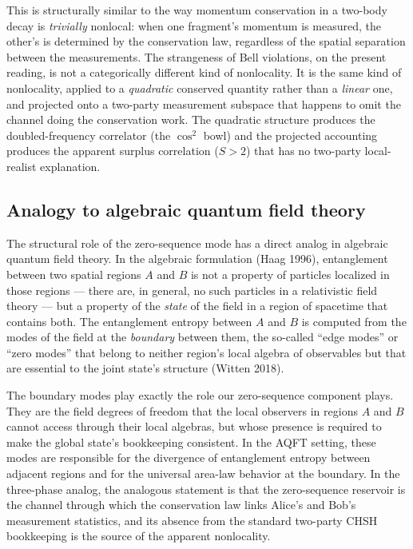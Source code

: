 \documentclass[
  11pt]{article}
\begin{document}
This is structurally similar to the way momentum conservation in a
two-body decay is \emph{trivially} nonlocal: when one fragment's
momentum is measured, the other's is determined by the conservation law,
regardless of the spatial separation between the measurements. The
strangeness of Bell violations, on the present reading, is not a
categorically different kind of nonlocality. It is the same kind of
nonlocality, applied to a \emph{quadratic} conserved quantity rather
than a \emph{linear} one, and projected onto a two-party measurement
subspace that happens to omit the channel doing the conservation work.
The quadratic structure produces the doubled-frequency correlator (the
\(\cos^2\) bowl) and the projected accounting produces the apparent
surplus correlation (\(S > 2\)) that has no two-party local-realist
explanation.

\subsection{Analogy to algebraic quantum field
theory}\label{analogy-to-algebraic-quantum-field-theory}

The structural role of the zero-sequence mode has a direct analog in
algebraic quantum field theory. In the algebraic formulation (Haag
1996), entanglement between two spatial regions \(A\) and \(B\) is not a
property of particles localized in those regions --- there are, in
general, no such particles in a relativistic field theory --- but a
property of the \emph{state} of the field in a region of spacetime that
contains both. The entanglement entropy between \(A\) and \(B\) is
computed from the modes of the field at the \emph{boundary} between
them, the so-called ``edge modes'' or ``zero modes'' that belong to
neither region's local algebra of observables but that are essential to
the joint state's structure (Witten 2018).

The boundary modes play exactly the role our zero-sequence component
plays. They are the field degrees of freedom that the local observers in
regions \(A\) and \(B\) cannot access through their local algebras, but
whose presence is required to make the global state's bookkeeping
consistent. In the AQFT setting, these modes are responsible for the
divergence of entanglement entropy between adjacent regions and for the
universal area-law behavior at the boundary. In the three-phase analog,
the analogous statement is that the zero-sequence reservoir is the
channel through which the conservation law links Alice's and Bob's
measurement statistics, and its absence from the standard two-party CHSH
bookkeeping is the source of the apparent nonlocality.
\end{document}
